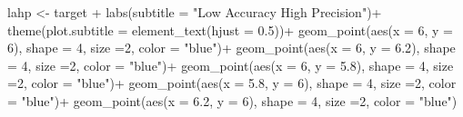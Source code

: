 \documentclass[
  letterpaper,
  DIV=11,
  numbers=noendperiod]{scrreprt}
\newenvironment{Shaded}{\begin{snugshade}}{\end{snugshade}}
\newcommand{\AttributeTok}[1]{\textcolor[rgb]{0.40,0.45,0.13}{#1}}
\newcommand{\DecValTok}[1]{\textcolor[rgb]{0.68,0.00,0.00}{#1}}
\newcommand{\FloatTok}[1]{\textcolor[rgb]{0.68,0.00,0.00}{#1}}
\newcommand{\FunctionTok}[1]{\textcolor[rgb]{0.28,0.35,0.67}{#1}}
\newcommand{\NormalTok}[1]{\textcolor[rgb]{0.00,0.23,0.31}{#1}}
\newcommand{\OtherTok}[1]{\textcolor[rgb]{0.00,0.23,0.31}{#1}}
\newcommand{\SpecialCharTok}[1]{\textcolor[rgb]{0.37,0.37,0.37}{#1}}
\newcommand{\StringTok}[1]{\textcolor[rgb]{0.13,0.47,0.30}{#1}}
\begin{document}
\begin{Shaded}
\begin{Highlighting}[]
\NormalTok{lahp }\OtherTok{\textless{}{-}}\NormalTok{ target }\SpecialCharTok{+}
  \FunctionTok{labs}\NormalTok{(}\AttributeTok{subtitle =} \StringTok{"Low Accuracy High Precision"}\NormalTok{)}\SpecialCharTok{+}
  \FunctionTok{theme}\NormalTok{(}\AttributeTok{plot.subtitle =} \FunctionTok{element\_text}\NormalTok{(}\AttributeTok{hjust =} \FloatTok{0.5}\NormalTok{))}\SpecialCharTok{+}
  \FunctionTok{geom\_point}\NormalTok{(}\FunctionTok{aes}\NormalTok{(}\AttributeTok{x =} \DecValTok{6}\NormalTok{, }\AttributeTok{y =} \DecValTok{6}\NormalTok{), }\AttributeTok{shape =} \DecValTok{4}\NormalTok{, }\AttributeTok{size =}\DecValTok{2}\NormalTok{, }\AttributeTok{color =} \StringTok{"blue"}\NormalTok{)}\SpecialCharTok{+}
  \FunctionTok{geom\_point}\NormalTok{(}\FunctionTok{aes}\NormalTok{(}\AttributeTok{x =} \DecValTok{6}\NormalTok{, }\AttributeTok{y =} \FloatTok{6.2}\NormalTok{), }\AttributeTok{shape =} \DecValTok{4}\NormalTok{, }\AttributeTok{size =}\DecValTok{2}\NormalTok{, }\AttributeTok{color =} \StringTok{"blue"}\NormalTok{)}\SpecialCharTok{+}
  \FunctionTok{geom\_point}\NormalTok{(}\FunctionTok{aes}\NormalTok{(}\AttributeTok{x =} \DecValTok{6}\NormalTok{, }\AttributeTok{y =} \FloatTok{5.8}\NormalTok{), }\AttributeTok{shape =} \DecValTok{4}\NormalTok{, }\AttributeTok{size =}\DecValTok{2}\NormalTok{, }\AttributeTok{color =} \StringTok{"blue"}\NormalTok{)}\SpecialCharTok{+}
  \FunctionTok{geom\_point}\NormalTok{(}\FunctionTok{aes}\NormalTok{(}\AttributeTok{x =} \FloatTok{5.8}\NormalTok{, }\AttributeTok{y =} \DecValTok{6}\NormalTok{), }\AttributeTok{shape =} \DecValTok{4}\NormalTok{, }\AttributeTok{size =}\DecValTok{2}\NormalTok{, }\AttributeTok{color =} \StringTok{"blue"}\NormalTok{)}\SpecialCharTok{+}
  \FunctionTok{geom\_point}\NormalTok{(}\FunctionTok{aes}\NormalTok{(}\AttributeTok{x =} \FloatTok{6.2}\NormalTok{, }\AttributeTok{y =} \DecValTok{6}\NormalTok{), }\AttributeTok{shape =} \DecValTok{4}\NormalTok{, }\AttributeTok{size =}\DecValTok{2}\NormalTok{, }\AttributeTok{color =} \StringTok{"blue"}\NormalTok{)}



\end{Highlighting}
\end{Shaded}
\end{document}
